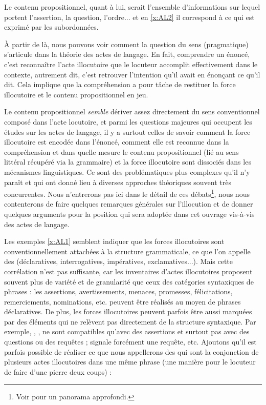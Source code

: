 \begin{refsegment}
Le contenu propositionnel, quant à lui,  serait l'ensemble d'informations sur lequel portent l'assertion, la question, l'ordre... et en \ref{x:AL2} il correspond à ce qui est exprimé par les subordonnées. 

À partir de là, nous pouvons voir comment la question du sens (pragmatique) s'articule dans la théorie des actes de langage.  En fait, comprendre un énoncé, c'est reconnaître l'acte illocutoire que le locuteur accomplit effectivement dans le contexte, autrement dit, c'est retrouver l'intention qu'il avait en énonçant ce qu'il dit.  Cela implique que la compréhension a pour tâche de restituer la force illocutoire et le contenu propositionnel en jeu.

Le contenu propositionnel \emph{semble} dériver assez directement du sens conventionnel composé dans l'acte locutoire, et parmi les questions majeures qui occupent les études sur les actes de langage, il y a surtout celles de savoir comment la force illocutoire est encodée dans l'énoncé, comment elle est reconnue dans la compréhension et dans quelle mesure le contenu propositionnel (lié au sens littéral récupéré via la grammaire) et la force illocutoire sont dissociés dans les mécanismes linguistiques.  Ce sont des problématiques plus complexes qu'il n'y paraît et qui ont donné lieu à diverses approches théoriques souvent très concurrentes. 
Nous n'entrerons pas ici dans le détail de ces débats\footnote{Voir \citet[chap. 5]{Levinson:83} pour un panorama approfondi.}, nous nous contenterons de faire quelques remarques générales sur l'illocution et de donner quelques arguments pour la position qui sera adoptée dans cet ouvrage vis-à-vis des actes de langage.

\sloppy

Les exemples \ref{x:AL1}  semblent indiquer que les forces illocutoires sont conventionnellement attachées à la structure grammaticale, ce que l'on appelle des  (déclaratives, interrogatives, impératives, exclamatives...).  Mais cette corrélation n'est pas suffisante, car les inventaires d'actes illocutoires proposent souvent plus de variété et de granularité que ceux des catégories syntaxiques de phrases : les assertions, avertissements, menaces, promesses, félicitations, remerciements, nominations, etc. peuvent être réalisés au moyen de phrases déclaratives.
De plus, les forces illocutoires peuvent parfois être aussi marquées par des éléments qui ne relèvent pas directement de la structure syntaxique. Par exemple, , ,  ne sont compatibles qu'avec des assertions et surtout pas avec des questions ou des requêtes ;  signale forcément une requête, etc. 
Ajoutons qu'il est parfois possible de réaliser ce que nous appellerons des  qui sont la conjonction de plusieurs actes illocutoires dans une même phrase (une manière pour le locuteur de faire d'une pierre deux coups) :


\end{refsegment}

